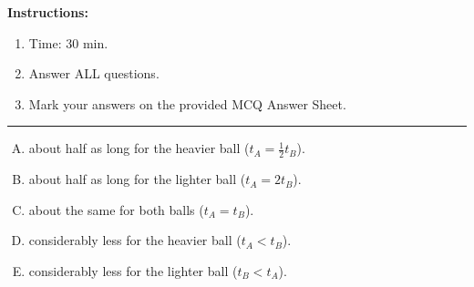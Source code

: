 

    \maketitle

    \eline[-2]
    \textbf{Instructions:}
    \begin{enumerate}
        \item Time: 30 min.
        \item Answer ALL questions.
        \item Mark your answers on the provided MCQ Answer Sheet.
    \end{enumerate}
    \begin{center}\rule{0.7\textwidth}{0.5pt}\end{center}


        \hspace{5em}\begin{minipage}{0.8\textwidth}
        \begin{enumerate}[(A)]
            \setlength{\itemsep}{0.5\baselineskip}
            \item about half as long for the heavier ball ($\displaystyle t_A = \frac{1}{2} t_B$).
            \item about half as long for the lighter ball ($t_A = 2 t_B$).
            \item about the same for both balls ($t_A = t_B$).
            \item considerably less for the heavier ball ($t_A < t_B$).
            \item considerably less for the lighter ball ($t_B < t_A$).
        \end{enumerate}
        \end{minipage}

